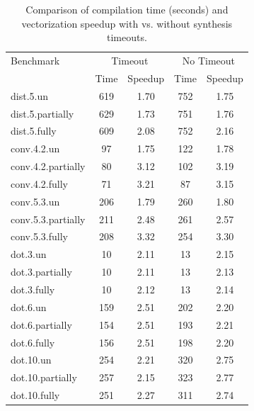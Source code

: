 \begin{table}
    \caption{Comparison of compilation time (seconds) and vectorization speedup with vs. without synthesis timeouts.}\label{tab:ilp-ablation}
    \centering
    \begin{tabular}{lcccc}
        \toprule
        Benchmark & \multicolumn{2}{c}{Timeout} & \multicolumn{2}{c}{No Timeout}\\\cline{2-5}

         & Time & Speedup & Time & Speedup \\\midrule
        dist.5.un & 619 & 1.70 & 752 & 1.75 \\
        dist.5.partially & 629 & 1.73 & 751 & 1.76 \\
        dist.5.fully & 609 & 2.08 & 752 & 2.16 \\
        \midrule
        conv.4.2.un & 97 & 1.75 & 122 & 1.78 \\
        conv.4.2.partially & 80 & 3.12 & 102 & 3.19 \\
        conv.4.2.fully & 71 & 3.21 & 87 & 3.15 \\
        \midrule
        conv.5.3.un & 206 & 1.79 & 260 & 1.80 \\
        conv.5.3.partially & 211 & 2.48 & 261 & 2.57 \\
        conv.5.3.fully & 208 & 3.32 & 254 & 3.30 \\
        \midrule
        dot.3.un & 10 & 2.11 & 13 & 2.15 \\
        dot.3.partially & 10 & 2.11 & 13 & 2.13 \\
        dot.3.fully & 10 & 2.12 & 13 & 2.14 \\
        \midrule
        dot.6.un & 159 & 2.51 & 202 & 2.20 \\
        dot.6.partially & 154 & 2.51 & 193 & 2.21 \\
        dot.6.fully & 156 & 2.51 & 198 & 2.20 \\
        \midrule
        dot.10.un & 254 & 2.21 & 320 & 2.75 \\
        dot.10.partially & 257 & 2.15 & 323 & 2.77 \\
        dot.10.fully & 251 & 2.27 & 311 & 2.74 \\
        \bottomrule
    \end{tabular}
\end{table}



